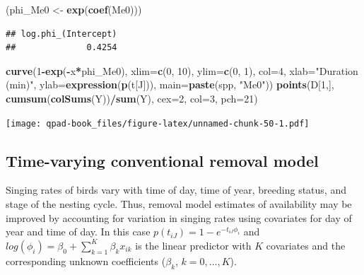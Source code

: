 \documentclass[12pt,]{book}
\newenvironment{Shaded}{\begin{snugshade}}{\end{snugshade}}
\newcommand{\DataTypeTok}[1]{\textcolor[rgb]{0.13,0.29,0.53}{#1}}
\newcommand{\DecValTok}[1]{\textcolor[rgb]{0.00,0.00,0.81}{#1}}
\newcommand{\KeywordTok}[1]{\textcolor[rgb]{0.13,0.29,0.53}{\textbf{#1}}}
\newcommand{\NormalTok}[1]{#1}
\newcommand{\OperatorTok}[1]{\textcolor[rgb]{0.81,0.36,0.00}{\textbf{#1}}}
\newcommand{\StringTok}[1]{\textcolor[rgb]{0.31,0.60,0.02}{#1}}
\begin{document}
\begin{Shaded}
\begin{Highlighting}[]
\NormalTok{(phi_Me0 <-}\StringTok{ }\KeywordTok{exp}\NormalTok{(}\KeywordTok{coef}\NormalTok{(Me0)))}
\end{Highlighting}
\end{Shaded}

\begin{verbatim}
## log.phi_(Intercept) 
##              0.4254
\end{verbatim}

\begin{Shaded}
\begin{Highlighting}[]
\KeywordTok{curve}\NormalTok{(}\DecValTok{1}\OperatorTok{-}\KeywordTok{exp}\NormalTok{(}\OperatorTok{-}\NormalTok{x}\OperatorTok{*}\NormalTok{phi_Me0), }\DataTypeTok{xlim=}\KeywordTok{c}\NormalTok{(}\DecValTok{0}\NormalTok{, }\DecValTok{10}\NormalTok{), }\DataTypeTok{ylim=}\KeywordTok{c}\NormalTok{(}\DecValTok{0}\NormalTok{, }\DecValTok{1}\NormalTok{), }\DataTypeTok{col=}\DecValTok{4}\NormalTok{,}
  \DataTypeTok{xlab=}\StringTok{"Duration (min)"}\NormalTok{, }\DataTypeTok{ylab=}\KeywordTok{expression}\NormalTok{(}\KeywordTok{p}\NormalTok{(t[J])), }
  \DataTypeTok{main=}\KeywordTok{paste}\NormalTok{(spp, }\StringTok{"Me0"}\NormalTok{))}
\KeywordTok{points}\NormalTok{(D[}\DecValTok{1}\NormalTok{,], }\KeywordTok{cumsum}\NormalTok{(}\KeywordTok{colSums}\NormalTok{(Y))}\OperatorTok{/}\KeywordTok{sum}\NormalTok{(Y), }\DataTypeTok{cex=}\DecValTok{2}\NormalTok{, }\DataTypeTok{col=}\DecValTok{3}\NormalTok{, }\DataTypeTok{pch=}\DecValTok{21}\NormalTok{)}
\end{Highlighting}
\end{Shaded}

\texttt{[image: qpad-book\_files/figure-latex/unnamed-chunk-50-1.pdf]}

\hypertarget{time-varying-conventional-removal-model}{%
\subsection{Time-varying conventional removal model}\label{time-varying-conventional-removal-model}}

Singing rates of birds vary with time of day, time of year, breeding status, and stage of the nesting cycle.
Thus, removal model estimates of availability may be improved by accounting for variation in singing rates
using covariates for day of year and time of day.
In this case \(p(t_{iJ}) = 1 - e^{-t_{iJ} \phi_{i}}\) and \(log(\phi_{i}) = \beta_{0} + \sum^{K}_{k=1} \beta_{k} x_{ik}\) is the linear predictor with \(K\) covariates and the corresponding unknown coefficients (\(\beta_{k}\), \(k = 0,\ldots, K\)).
\end{document}
